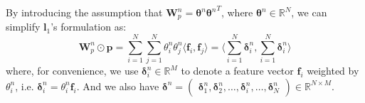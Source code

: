 \documentclass[conference]{IEEEtran}
\newcommand{\bs}{\boldsymbol}
\newcommand{\bW}{\bs{W}}
\newcommand{\bl}{\bs{l}}
\newcommand{\bp}{\bs{p}}
\newcommand{\Bf}{\bs{f}}
\newcommand{\btheta}{\bs{\theta}}
\newcommand{\mR}{\mathbb{R}}
\newcommand{\yanru}[1]{{\bf \color{blue} [[Yanru says ``#1'']]}}
\newcommand{\weinan}[1]{{\bf \color{red} [[Weinan says ``#1'']]}}
\newcommand{\kan}[1]{{\bf \color{green} [[Kan says ``#1'']]}}
\begin{document}


By introducing the assumption that $\bW_p^n = \btheta^n {\btheta^n}^T$, where $ \btheta^n \in \mR^N$, we can simplify $\bl_1$'s formulation as:
\begin{equation}
\bW_p^n \odot \bp = \sum_{i=1}^N {\sum_{j=1}^N \theta^n_i \theta^n_j \langle \Bf_i, \Bf_j \rangle} = \langle \sum_{i=1}^N\bs\delta^n_i, \sum_{i=1}^N\bs\delta^n_i \rangle
\end{equation}
where, for convenience, we use $\bs\delta^n_i \in \mR^M$ to denote a feature vector $\Bf_i$ weighted by $\theta^n_i$, i.e. $\bs\delta^n_i = \theta^n_i \Bf_i$. And we also have $\bs\delta^n = \begin{pmatrix} \bs\delta^n_1, \bs\delta^n_2, \ldots, \bs\delta^n_i, \ldots, \bs\delta^n_N \end{pmatrix} \in \mR^{N \times M}$.
\end{document}
